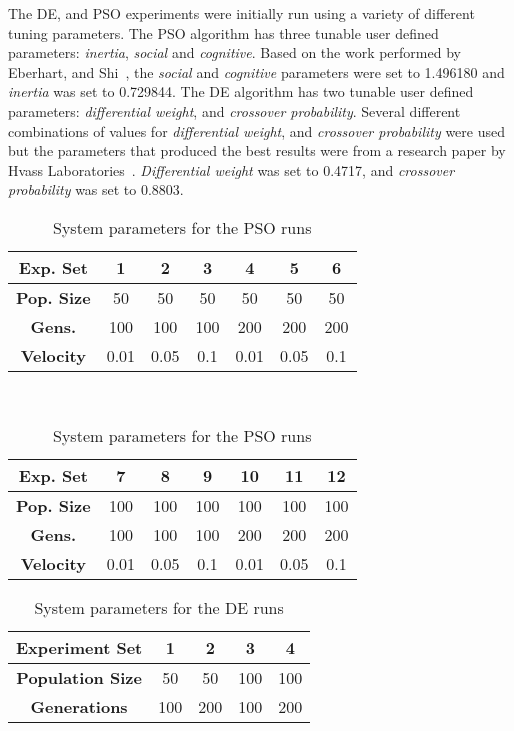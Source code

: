 The DE, and PSO experiments were initially run using a variety of different tuning parameters. The PSO algorithm has three tunable user defined parameters: \textit{inertia}, \textit{social} and \textit{cognitive}. Based on the work performed by Eberhart, and Shi~\cite{eberhart2000comparing}, the \textit{social} and \textit{cognitive} parameters were set to 1.496180 and \textit{inertia} was set to 0.729844. The DE algorithm has two tunable user defined parameters: \textit{differential weight}, and \textit{crossover probability}. Several different combinations of values for \textit{differential weight}, and \textit{crossover probability} were used but the parameters that produced the best results were from a research paper by Hvass Laboratories~\cite{pedersen2010good}. \textit{Differential weight} was set to 0.4717, and \textit{crossover probability} was set to 0.8803.

\begin{table}
	\centering
	\begin{tabular}{ | >{\bfseries}c | c | c | c | c | c | c | }
		\hline
		Exp. Set & 1 & 2 & 3 & 4 & 5 & 6 \\ \hline
		Pop. Size & 50 & 50 & 50 & 50 & 50 & 50 \\ \hline
		Gens. & 100 & 100 & 100 & 200 & 200 & 200 \\ \hline
		Velocity & 0.01 & 0.05 & 0.1 & 0.01 & 0.05 & 0.1 \\ \hline
	\end{tabular}
	\\
	\vspace{3 mm}
	\begin{tabular}{ | >{\bfseries}c | c | c | c | c | c | c | }
		\hline
		Exp. Set & 7 & 8 & 9 & 10 & 11 & 12 \\ \hline
		Pop. Size & 100 & 100 & 100 & 100 & 100 & 100 \\ \hline
		Gens. & 100 & 100 & 100 & 200 & 200 & 200 \\ \hline
		Velocity & 0.01 & 0.05 & 0.1 & 0.01 & 0.05 & 0.1 \\ \hline
	\end{tabular}
	\caption{System parameters for the PSO runs}
	\label{table:ea-pso}
\end{table}

\begin{table}
	\centering
	\begin{tabular}{ | >{\bfseries}c | c | c | c | c | }
		\hline
		Experiment Set & 1 & 2 & 3 & 4 \\ \hline
		Population Size & 50 & 50 & 100 & 100 \\ \hline
		Generations & 100 & 200 & 100 & 200 \\ \hline
	\end{tabular}
	\caption{System parameters for the DE runs}
	\label{table:ea-de}
\end{table}

